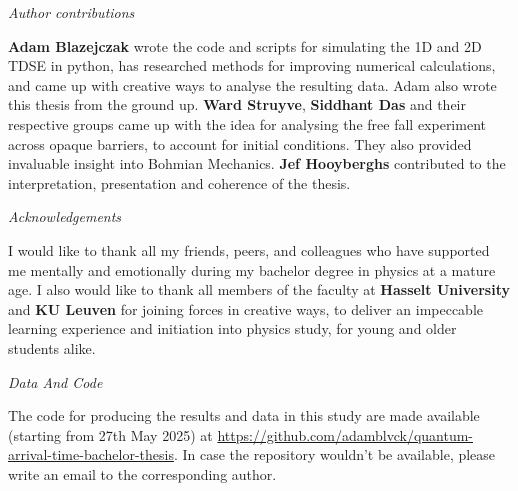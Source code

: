 \textit{Author contributions}

\textbf{Adam Blazejczak} wrote the code and scripts for simulating the 1D and 2D TDSE in python, has researched methods for improving numerical calculations, and came up with creative ways to analyse the resulting data. Adam also wrote this thesis from the ground up. \textbf{Ward Struyve}, \textbf{Siddhant Das} and their respective groups came up with the idea for analysing the free fall experiment across opaque barriers, to account for initial conditions. They also provided invaluable insight into Bohmian Mechanics. \textbf{Jef Hooyberghs} contributed to the interpretation, presentation and coherence of the thesis.

\textit{Acknowledgements}

I would like to thank all my friends, peers, and colleagues who have supported me mentally and emotionally during my bachelor degree in physics at a mature age. I also would like to thank all members of the faculty at \textbf{Hasselt University} and \textbf{KU Leuven} for joining forces in creative ways, to deliver an impeccable learning experience and initiation into physics study, for young and older students alike.

\textit{Data And Code}

The code for producing the results and data in this study are made available (starting from 27th May 2025) at \url{https://github.com/adamblvck/quantum-arrival-time-bachelor-thesis}. In case the repository wouldn't be available, please write an email to the corresponding author.